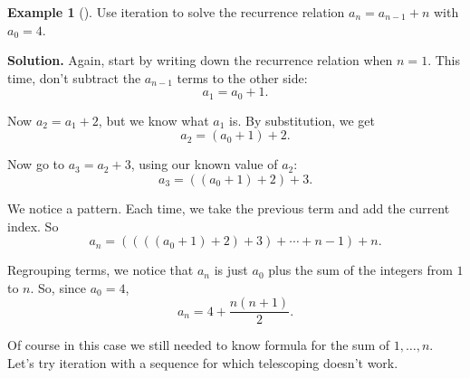 \documentclass[12pt,]{book}
\theoremstyle{plain}
\theoremstyle{definition}
\theoremstyle{definition}
\newtheorem{example}[theorem]{Example}
\theoremstyle{definition}
\numberwithin{equation}{chapter}
\begin{document}
\begin{example}[]\label{example-21}
\hypertarget{p-308}{}%
Use iteration to solve the recurrence relation \(a_n = a_{n-1} + n\) with \(a_0 = 4\).%
\par\smallskip%
\noindent\textbf{Solution.}\hypertarget{solution-35}{}\quad%
\hypertarget{p-309}{}%
Again, start by writing down the recurrence relation when \(n = 1\). This time, don't subtract the \(a_{n-1}\) terms to the other side:%
\begin{equation*}
a_1 = a_0 + 1.
\end{equation*}
%
\par
\hypertarget{p-310}{}%
Now \(a_2 = a_1 + 2\), but we know what \(a_1\) is. By substitution, we get%
\begin{equation*}
a_2 = (a_0 + 1) + 2.
\end{equation*}
%
\par
\hypertarget{p-311}{}%
Now go to \(a_3 = a_2 + 3\), using our known value of \(a_2\):%
\begin{equation*}
a_3 = ((a_0 + 1) + 2) + 3.
\end{equation*}
%
\par
\hypertarget{p-312}{}%
We notice a pattern. Each time, we take the previous term and add the current index. So%
\begin{equation*}
a_n = ((((a_0 + 1) +2)+3)+\cdots + n-1) + n.
\end{equation*}
%
\par
\hypertarget{p-313}{}%
Regrouping terms, we notice that \(a_n\) is just \(a_0\) plus the sum of the integers from \(1\) to \(n\). So, since \(a_0 = 4\),%
\begin{equation*}
a_n = 4 + \frac{n(n+1)}{2}.
\end{equation*}
%
\end{example}
\hypertarget{p-314}{}%
Of course in this case we still needed to know formula for the sum of \(1,\ldots,n\). Let's try iteration with a sequence for which telescoping doesn't work.%
\end{document}
